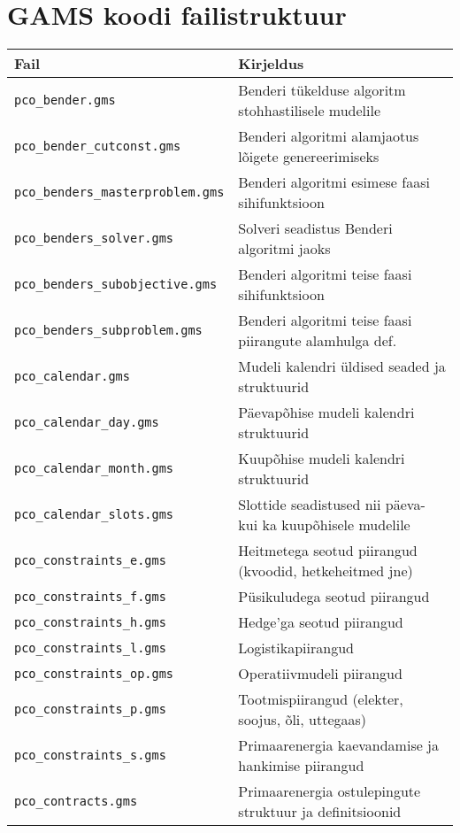 \section{GAMS koodi failistruktuur}
\label{app:failid}

\begin{longtable}{l l}
Fail & Kirjeldus \\
\hline
\texttt{pco\_bender.gms} & Benderi tükelduse algoritm stohhastilisele mudelile \\
\texttt{pco\_bender\_cutconst.gms} & Benderi algoritmi alamjaotus lõigete genereerimiseks\\
\texttt{pco\_benders\_masterproblem.gms} & Benderi algoritmi esimese faasi sihifunktsioon\\
\texttt{pco\_benders\_solver.gms} & Solveri seadistus Benderi algoritmi jaoks\\
\texttt{pco\_benders\_subobjective.gms} & Benderi algoritmi teise faasi sihifunktsioon\\
\texttt{pco\_benders\_subproblem.gms} & Benderi algoritmi teise faasi piirangute alamhulga def. \\
\texttt{pco\_calendar.gms} & Mudeli kalendri üldised seaded ja struktuurid\\
\texttt{pco\_calendar\_day.gms} & Päevapõhise mudeli kalendri struktuurid\\
\texttt{pco\_calendar\_month.gms} & Kuupõhise mudeli kalendri struktuurid\\
\texttt{pco\_calendar\_slots.gms} & Slottide seadistused nii päeva- kui ka kuupõhisele mudelile\\
\texttt{pco\_constraints\_e.gms} & Heitmetega seotud piirangud (kvoodid, hetkeheitmed jne)\\
\texttt{pco\_constraints\_f.gms} & Püsikuludega seotud piirangud\\
\texttt{pco\_constraints\_h.gms} & Hedge'ga seotud piirangud\\
\texttt{pco\_constraints\_l.gms} & Logistikapiirangud\\
\texttt{pco\_constraints\_op.gms} & Operatiivmudeli piirangud\\
\texttt{pco\_constraints\_p.gms} & Tootmispiirangud (elekter, soojus, õli, uttegaas)\\
\texttt{pco\_constraints\_s.gms} & Primaarenergia kaevandamise ja hankimise piirangud\\
\texttt{pco\_contracts.gms} & Primaarenergia ostulepingute struktuur ja definitsioonid\\

\end{longtable}
